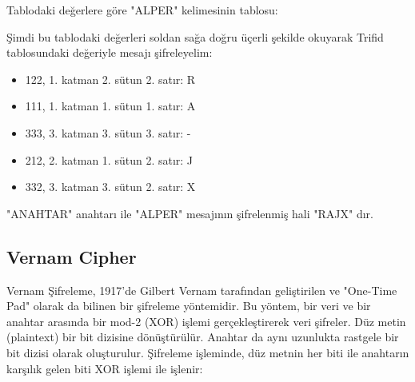 \newpage

\begin{table}[ht]
\centering
{}
\end{table}

Tablodaki değerlere göre "ALPER" kelimesinin tablosu:

\begin{table}[ht]
\centering
{}
\end{table}

Şimdi bu tablodaki değerleri soldan sağa doğru üçerli şekilde okuyarak Trifid tablosundaki değeriyle mesajı şifreleyelim:

\begin{itemize}
    \item 122, 1. katman 2. sütun 2. satır: R 
    \item 111, 1. katman 1. sütun 1. satır: A
    \item 333, 3. katman 3. sütun 3. satır: -
    \item 212, 2. katman 1. sütun 2. satır: J
    \item 332, 3. katman 3. sütun 2. satır: X
\end{itemize}

"ANAHTAR" anahtarı ile "ALPER" mesajının şifrelenmiş hali "RAJX" dır.

\newpage

\subsection{Vernam Cipher}

Vernam Şifreleme, 1917'de Gilbert Vernam tarafından geliştirilen ve "One-Time Pad" olarak da bilinen bir şifreleme yöntemidir. Bu yöntem, bir veri ve bir anahtar arasında bir mod-2 (XOR) işlemi gerçekleştirerek veri şifreler. Düz metin (plaintext) bir bit dizisine dönüştürülür. Anahtar da aynı uzunlukta rastgele bir bit dizisi olarak oluşturulur. Şifreleme işleminde, düz metnin her biti ile anahtarın karşılık gelen biti XOR işlemi ile işlenir:

